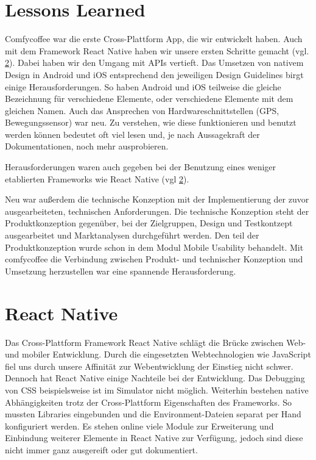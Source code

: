 \section{Lessons Learned}
Comfycoffee war die erste Cross-Plattform App, die wir entwickelt haben. Auch mit dem Framework React Native haben wir unsere ersten Schritte gemacht (vgl. \ref{sec:reactnative}). Dabei haben wir den Umgang mit APIs vertieft. Das Umsetzen von nativem Design in Android und iOS entsprechend den jeweiligen Design Guidelines birgt einige Herausforderungen. So haben Android und iOS teilweise die gleiche Bezeichnung für verschiedene Elemente, oder verschiedene Elemente mit dem gleichen Namen. Auch das Ansprechen von Hardwareschnittstellen (GPS, Bewegungssensor) war neu. Zu verstehen, wie diese funktionieren und benutzt werden können bedeutet oft viel lesen und, je nach Aussagekraft der Dokumentationen, noch mehr ausprobieren.

Herausforderungen waren auch gegeben bei der Benutzung eines weniger etablierten Frameworks wie React Native (vgl \ref{sec:reactnative}).

Neu war außerdem die technische Konzeption mit der Implementierung der zuvor ausgearbeiteten, technischen Anforderungen. Die technische Konzeption steht der Produktkonzeption gegenüber, bei der Zielgruppen, Design und Testkontzept ausgearbeitet und Marktanalysen durchgeführt werden. Den teil der Produktkonzeption wurde schon in dem Modul Mobile Usability behandelt. Mit comfycoffee die Verbindung zwischen Produkt- und technischer Konzeption und Umsetzung herzustellen war eine spannende Herausforderung.

\section{React Native}
\label{sec:reactnative}
Das Cross-Plattform Framework React Native schlägt die Brücke zwischen Web- und mobiler Entwicklung. Durch die eingesetzten Webtechnologien wie JavaScript fiel uns durch unsere Affinität zur Webentwicklung der Einstieg nicht schwer. Dennoch hat React Native einige Nachteile bei der Entwicklung. Das Debugging von CSS beispielsweise ist im Simulator nicht möglich. Weiterhin bestehen native Abhängigkeiten trotz der Cross-Plattform Eigenschaften des Frameworks. So mussten Libraries eingebunden und die Environment-Dateien separat per Hand konfiguriert werden. Es stehen online viele Module zur Erweiterung und Einbindung weiterer Elemente in React Native zur Verfügung, jedoch sind diese nicht immer ganz ausgereift oder gut dokumentiert.

